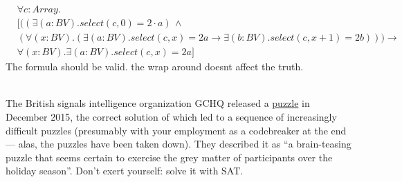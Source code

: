 \documentclass[11pt]{article}
\begin{document}
\begin{qunlist}
\begin{qparts}
    \begin{answer}
      \begin{equation}
        \begin{split}
          &\forall c:Array.\\
          &[((\exists (a:BV). select(c,0)=2\cdot a )\,\land\\
              &\left(
                \forall (x:BV).\left( \exists (a:BV).select(c,x)=2a \rightarrow \exists (b:BV).select(c,x+1)=2b \right)
            \right))\rightarrow\\
          &\forall (x:BV).\exists (a:BV).select(c,x)=2a]
        \end{split}
      \end{equation}
      The formula should be valid. the wrap around doesnt affect the truth.
    \end{answer}

  \end{qparts}

  \\
  The British signals intelligence organization GCHQ released a \href{https://web.archive.org/web/20160330032843/http://www.gchq.gov.uk/press_and_media/news_and_features/Pages/Directors-Christmas-puzzle-2015.aspx}{puzzle} in December 2015, the correct solution of which led to a sequence of increasingly difficult puzzles (presumably with your employment as a codebreaker at the end --- alas, the puzzles have been taken down).
  They described it as ``a brain-teasing puzzle that seems certain to exercise the grey matter of participants over the holiday season''.
  Don't exert yourself: solve it with SAT.

\end{qunlist}
\end{document}
